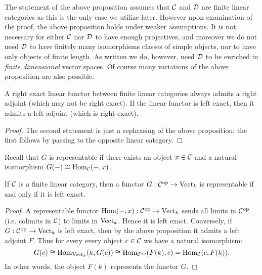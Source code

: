 \documentclass{amsart}
\begin{document}
\begin{remark}
	The statement of the above proposition assumes that $\mathcal C$ and $\mathcal D$ are finite linear categories as this is the only case we utilize later. However upon examination of the proof, the above proposition holds under weaker assumptions. It is not necessary for either $\mathcal C$ nor $\mathcal D$ to have enough projectives, and moreover we do not need $\mathcal D$ to have finitely many isomorphisms classes of simple objects, nor to have only objects of finite length. As written we do, however, need $\mathcal D$ to be enriched in {\em finite dimensional} vector spaces. Of course many variations of the above proposition are also possible. 
\end{remark}

\begin{corollary}
	A right exact linear functor between finite linear categories always admits a right adjoint (which may not be right exact). If the linear functor is left exact, then it admits a left adjoint (which is right exact). 
\end{corollary}

\begin{proof}
	The second statement is just a rephrasing of the above proposition; the first follows by passing to the opposite linear category.  
\end{proof}

\noindent Recall that $G$ is representable if there exists an object $x \in \mathcal C$ and a natural isomorphism $G(-) \cong \operatorname{Hom}_{\mathcal C}(-, x)$. 


\begin{corollary} \label{cor:representable}
If $\mathcal C$ is a finite linear category, then a functor $G: \mathcal C^\textrm{op} \to \mathrm{Vect}_k$ is representable if and only if it is left exact. 
\end{corollary}

\begin{proof}
	A representable functor $\operatorname{Hom}(-, x):\mathcal C^\text{op} \to \mathrm{Vect}_k$ sends all limits in $\mathcal C^\text{op}$ (i.e. colimits in $\mathcal C$) to limits in $\mathrm{Vect}_k$. Hence it is left exact. 
%
%		
Conversely, if $G: \mathcal C^\text{op} \to \mathrm{Vect}_k$ is left exact, then by the above proposition it admits a left adjoint $F$. Thus for every every object $c \in \mathcal C$ we have a natural isomorphism:
	\begin{equation*}
		G(c) \cong \operatorname{Hom}_{\mathrm{Vect}_k}( k, G(c)) \cong \operatorname{Hom}_{\mathcal C^{\mathrm{op}}}( F(k), c) = \operatorname{Hom}_{\mathcal C}(c, F(k) ).
	\end{equation*}
	In other words,  the object $F(k)$ represents the functor $G$. 
\end{proof}
\end{document}

